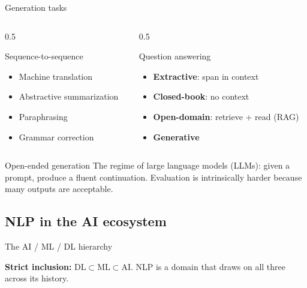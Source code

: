 \documentclass[11pt,aspectratio=169]{beamer}
\begin{document}
\begin{frame}{Generation tasks}
\begin{columns}[T]
\begin{column}{0.5\textwidth}
\begin{block}{Sequence-to-sequence}
\begin{itemize}
    \item Machine translation
    \item Abstractive summarization
    \item Paraphrasing
    \item Grammar correction
\end{itemize}
\end{block}
\end{column}
\begin{column}{0.5\textwidth}
\begin{block}{Question answering}
\begin{itemize}
    \item \textbf{Extractive}: span in context
    \item \textbf{Closed-book}: no context
    \item \textbf{Open-domain}: retrieve + read (RAG)
    \item \textbf{Generative}
\end{itemize}
\end{block}
\end{column}
\end{columns}
\vfill
\begin{exampleblock}{Open-ended generation}
The regime of large language models (LLMs): given a prompt, produce a fluent continuation. Evaluation is intrinsically harder because many outputs are acceptable.
\end{exampleblock}
\end{frame}

\subsection{NLP in the AI ecosystem}

\begin{frame}{The AI / ML / DL hierarchy}
\begin{center}
\end{center}
\vfill
\textbf{Strict inclusion:} $\mathrm{DL} \subset \mathrm{ML} \subset \mathrm{AI}$. NLP is a domain that draws on all three across its history.
\end{frame}
\end{document}
